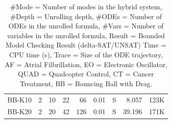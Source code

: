 {\begin{table}[!th]
\begin{tabular}{l|r|r|r|r|r|r|r|r}
    \hline
    \hline
    BB-K10 & 2     & 10       & 22     & 66      & 0.01        & S & 8.057     & 123K  \\
    BB-K20 & 2     & 20       & 42     & 126     & 0.01        & S & 39.196    & 171K  \\
    \hline
    \hline
  \end{tabular}
  \caption{\small
    \#Mode = Number of modes in the hybrid system,
    \#Depth = Unrolling depth,
    \#ODEs = Number of ODEs in the unrolled formula,
    \#Vars = Number of variables in the unrolled formula,
    Result = Bounded Model Checking Result (delta-SAT/UNSAT)
    Time = CPU time (s),
    Trace = Size of the ODE trajectory,
    AF = Atrial Filbrillation,
    EO = Electronic Oscillator,
    QUAD = Quadcopter Control,
    CT = Cancer Treatment,
    BB = Bouncing Ball with Drag.
}\label{tbl:exp}
\end{table}
}
